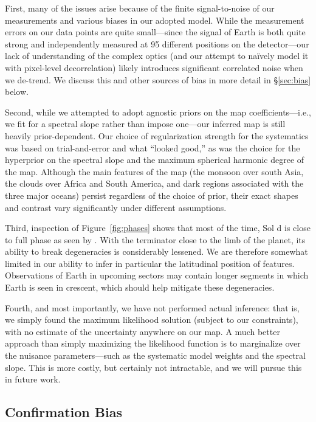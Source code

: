 \documentclass[modern]{aastex62}
\begin{document}
First, many of the issues arise because
of the finite signal-to-noise of our measurements and various biases in
our adopted model. While the measurement errors on our data points are
quite small---since the signal of Earth is both quite strong and independently
measured at 95 different positions on the detector---our lack of understanding
of the complex optics (and our
attempt to na{\"i}vely model it with pixel-level decorrelation) likely
introduces significant correlated noise when we de-trend. We discuss this
and other sources of bias in more detail in \S\ref{sec:bias} below.

Second, while we attempted to adopt agnostic priors on the map coefficients---i.e.,
we fit for a spectral slope rather than impose one---our inferred map is still 
heavily prior-dependent. Our choice of regularization strength for the systematics
was based on trial-and-error and what ``looked good,'' as was the choice for the 
hyperprior on the spectral
slope and the maximum spherical harmonic degree of the map. Although the main
features of the map (the monsoon over south Asia, the clouds over Africa and
South America, and dark regions associated with the three major oceans) persist
regardless of the choice of prior, their exact shapes and contrast vary
significantly under different assumptions.

Third, inspection of Figure~\ref{fig:phases} shows that most of the time, Sol
d is close to full phase as seen by \TESS.
With the terminator close to the limb
of the planet, its ability to break degeneracies is considerably lessened.
We are therefore somewhat limited in our ability to infer in particular the
latitudinal position of features. Observations of Earth in upcoming
sectors may contain longer segments in which Earth is seen in crescent,
which should help mitigate these degeneracies.

Fourth, and most importantly, we have not performed actual inference: that is, 
we simply found the maximum likelihood solution (subject to our constraints),
with no estimate of the uncertainty anywhere on our map. A much better
approach than simply maximizing the likelihood function is to marginalize
over the nuisance parameters---such as the systematic model weights and the spectral
slope. This is more costly, but certainly not intractable, and we will
pursue this in future work.

\subsection{Confirmation Bias}
\label{sec:confirmation}
\end{document}

